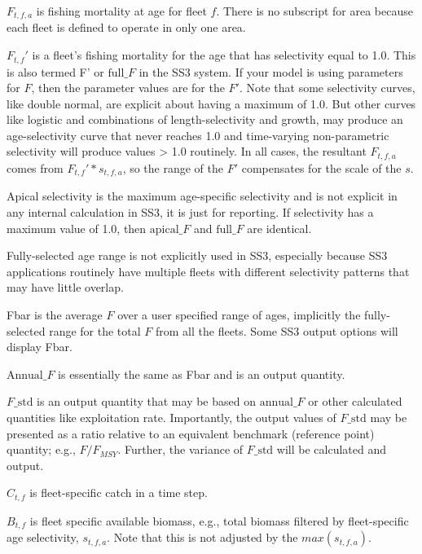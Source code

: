 $F_{t,f,a}$ is fishing mortality at age for fleet $f$. There is no subscript for area because each fleet is defined to operate in only one area.

$F_{t,f}'$ is a fleet's fishing mortality for the age that has selectivity equal to 1.0. This is also termed F' or $\text{full\_}F$ in the SS3 system. If your model is using parameters for $F$, then the parameter values are for the $F'$. Note that some selectivity curves, like double normal, are explicit about having a maximum of 1.0. But other curves like logistic and combinations of length-selectivity and growth, may produce an age-selectivity curve that never reaches 1.0 and time-varying non-parametric selectivity will produce values > 1.0 routinely. In all cases, the resultant $F_{t,f,a}$ comes from $F_{t,f}' * s_{t,f,a}$, so the range of the $F'$ compensates for the scale of the $s$.

Apical selectivity is the maximum age-specific selectivity and is not explicit in any internal calculation in SS3, it is just for reporting. If selectivity has a maximum value of 1.0, then $\text{apical\_}F$ and $\text{full\_}F$ are identical.

Fully-selected age range is not explicitly used in SS3, especially because SS3 applications routinely have multiple fleets with different selectivity patterns that may have little overlap.

Fbar is the average $F$ over a user specified range of ages, implicitly the fully-selected range for the total $F$ from all the fleets. Some SS3 output options will display Fbar.

$\text{Annual\_}F$ is essentially the same as Fbar and is an output quantity.

$F\text{\_std}$ is an output quantity that may be based on $\text{annual\_}F$ or other calculated quantities like exploitation rate. Importantly, the output values of $F\text{\_std}$ may be presented as a ratio relative to an equivalent benchmark (reference point) quantity; e.g., $F / F_{MSY}$. Further, the variance of $F\text{\_std}$ will be calculated and output.

$C_{t,f}$ is fleet-specific catch in a time step.

$B_{t,f}$ is fleet specific available biomass, e.g., total biomass filtered by fleet-specific age selectivity, $s_{t,f,a}$. Note that this is not adjusted by the $max(s_{t,f,a})$.


